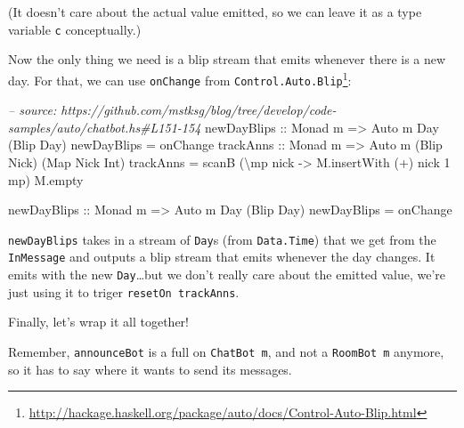 \documentclass[]{article}
\newenvironment{Shaded}{}{}
\newcommand{\DataTypeTok}[1]{\textcolor[rgb]{0.56,0.13,0.00}{{#1}}}
\newcommand{\DecValTok}[1]{\textcolor[rgb]{0.25,0.63,0.44}{{#1}}}
\newcommand{\CommentTok}[1]{\textcolor[rgb]{0.38,0.63,0.69}{\textit{{#1}}}}
\newcommand{\OtherTok}[1]{\textcolor[rgb]{0.00,0.44,0.13}{{#1}}}
\newcommand{\FunctionTok}[1]{\textcolor[rgb]{0.02,0.16,0.49}{{#1}}}
\newcommand{\NormalTok}[1]{{#1}}
\renewcommand{\href}[2]{#2\footnote{\url{#1}}}
\begin{document}
(It doesn't care about the actual value emitted, so we can leave it as a type variable \texttt{c}
conceptually.)

Now the only thing we need is a blip stream that emits whenever there is a new day. For that, we can
use \texttt{onChange} from
\href{http://hackage.haskell.org/package/auto/docs/Control-Auto-Blip.html}{\texttt{Control.Auto.Blip}}:

\begin{Shaded}
\begin{Highlighting}[]
\CommentTok{-- source: https://github.com/mstksg/blog/tree/develop/code-samples/auto/chatbot.hs#L151-154}
\OtherTok{    newDayBlips ::} \DataTypeTok{Monad} \NormalTok{m }\OtherTok{=>} \DataTypeTok{Auto} \NormalTok{m }\DataTypeTok{Day} \NormalTok{(}\DataTypeTok{Blip} \DataTypeTok{Day}\NormalTok{)}
    \NormalTok{newDayBlips }\FunctionTok{=} \NormalTok{onChange}
\OtherTok{    trackAnns ::} \DataTypeTok{Monad} \NormalTok{m }\OtherTok{=>} \DataTypeTok{Auto} \NormalTok{m (}\DataTypeTok{Blip} \DataTypeTok{Nick}\NormalTok{) (}\DataTypeTok{Map} \DataTypeTok{Nick} \DataTypeTok{Int}\NormalTok{)}
    \NormalTok{trackAnns }\FunctionTok{=} \NormalTok{scanB (\textbackslash{}mp nick }\OtherTok{->} \NormalTok{M.insertWith (}\FunctionTok{+}\NormalTok{) nick }\DecValTok{1} \NormalTok{mp) M.empty}


\OtherTok{newDayBlips ::} \DataTypeTok{Monad} \NormalTok{m }\OtherTok{=>} \DataTypeTok{Auto} \NormalTok{m }\DataTypeTok{Day} \NormalTok{(}\DataTypeTok{Blip} \DataTypeTok{Day}\NormalTok{)}
\NormalTok{newDayBlips }\FunctionTok{=} \NormalTok{onChange}
\end{Highlighting}
\end{Shaded}

\texttt{newDayBlips} takes in a stream of \texttt{Day}s (from \texttt{Data.Time}) that we get from
the \texttt{InMessage} and outputs a blip stream that emits whenever the day changes. It emits with
the new \texttt{Day}\ldots{}but we don't really care about the emitted value, we're just using it to
triger \texttt{resetOn\ trackAnns}.

Finally, let's wrap it all together!

Remember, \texttt{announceBot} is a full on \texttt{ChatBot\ m}, and not a \texttt{RoomBot\ m}
anymore, so it has to say where it wants to send its messages.
\end{document}
